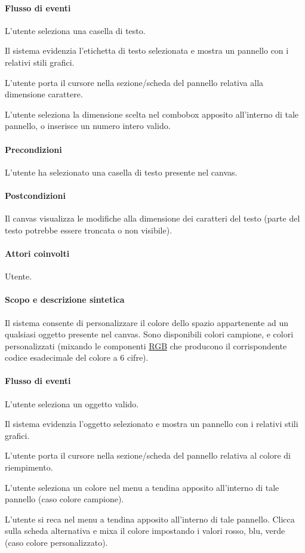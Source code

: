 \paragraph{Flusso di eventi}
\begin{elenconumerato}[\textbf{}]{\subsubsecindent}
\item L'utente seleziona una casella di testo.
\item Il sistema evidenzia l'etichetta di testo selezionata e mostra un pannello con i relativi stili grafici.
\item L'utente porta il cursore nella sezione/scheda del pannello relativa alla dimensione carattere.
\item L'utente seleziona la dimensione scelta nel combobox apposito all'interno di tale pannello, o inserisce un numero intero valido.
\end{elenconumerato}
\paragraph{Precondizioni} L'utente ha selezionato una casella di testo presente nel canvas.
\paragraph{Postcondizioni}  Il canvas visualizza le modifiche alla dimensione dei caratteri del testo (parte del testo potrebbe essere troncata o non visibile).

\paragraph{Attori coinvolti} Utente.
\paragraph{Scopo e descrizione sintetica}   Il sistema consente di personalizzare il colore dello spazio appartenente ad un qualsiasi oggetto presente nel canvas. Sono disponibili colori campione, e colori personalizzati (mixando le componenti \underline{RGB} che producono il corrispondente codice esadecimale del colore a 6 cifre).
\paragraph{Flusso di eventi}
\begin{elenconumerato}[\textbf{}]{\subsubsecindent}
\item L'utente seleziona un oggetto valido.
\item Il sistema evidenzia l'oggetto selezionato e mostra un pannello con i relativi stili grafici.
\item L'utente porta il cursore nella sezione/scheda del pannello relativa al colore di riempimento.
\item L'utente seleziona un colore nel menu a tendina apposito all'interno di tale pannello (caso colore campione).
\item L'utente si reca nel menu a tendina apposito all'interno di tale pannello. Clicca sulla scheda alternativa e mixa il colore impostando i valori rosso, blu, verde (caso colore personalizzato).
\end{elenconumerato}
